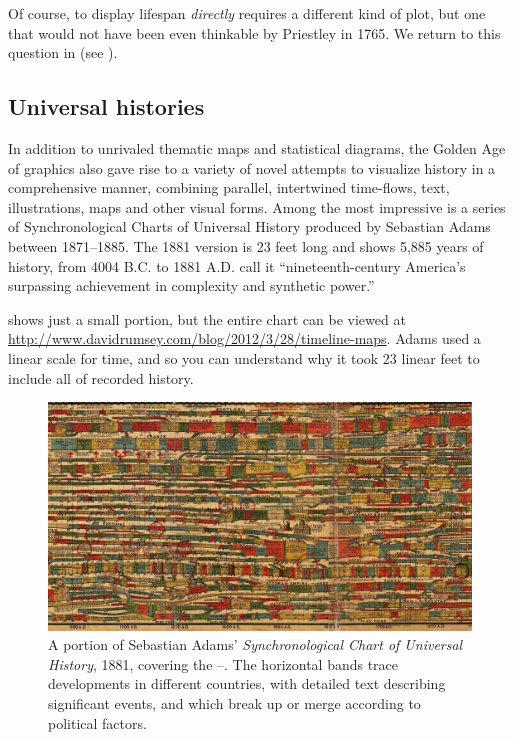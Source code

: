 Of course, to display lifespan \emph{directly} requires a different kind of plot, but one that
would not have been even thinkable by Priestley in 1765.  We return to this question in
 (see ).


\subsection{Universal histories}
In addition to unrivaled thematic maps and statistical diagrams, the Golden Age of graphics also
gave rise to a variety of novel attempts to visualize history in a comprehensive manner,
combining parallel, intertwined time-flows, text, illustrations, maps and other visual forms.
Among the most impressive is a series of Synchronological Charts of Universal History
produced by Sebastian Adams between 1871--1885.
The 1881 version is 23 feet long and shows 5,885 years of history, from 4004 B.C. to 1881 A.D.
\citet[p. 172]{RosenbergGrafton:2010} call it ``nineteenth-century America's surpassing achievement in complexity and synthetic power.'' 

 shows just a small portion, but the entire chart can be viewed at
\url{http://www.davidrumsey.com/blog/2012/3/28/timeline-maps}.  Adams used a linear scale for
time, and so you can understand why it took 23 linear feet to include all of recorded history.

\begin{figure}[!htb]
  \centering
  \includegraphics[width=\textwidth,clip]{fig/Adams1881-4}
  \caption{A portion of Sebastian Adams' \emph{Synchronological Chart of Universal History}, 1881,
  covering the --.
  The horizontal bands trace developments in different countries, with detailed text describing significant
  events, and which break up or merge according to political factors.
  }
  \label{fig:Adams1881}
\end{figure}

